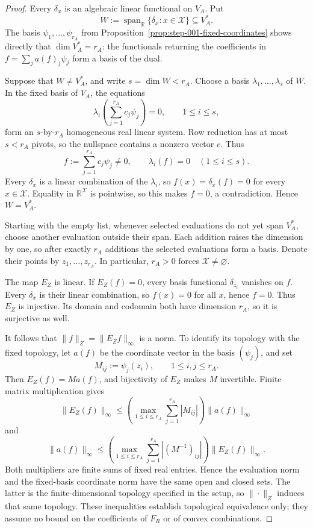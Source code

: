 \begin{proof}
Every \(\delta_x\) is an algebraic linear functional on \(V_A\).  Put
\[
W:=\operatorname{span}_{\mathbb R}\{\delta_x:x\in\mathcal X\}
\subseteq V_A^*.
\]
The basis \(\psi_1,\ldots,\psi_{r_A}\) from
Proposition~\ref{prop:step-001-fixed-coordinates} shows directly that
\(\dim V_A^*=r_A\): the functionals returning the coefficients in
\(f=\sum_ja(f)_j\psi_j\) form a basis of the dual.

Suppose that \(W\ne V_A^*\), and write \(s=\dim W<r_A\).  Choose a basis
\(\lambda_1,\ldots,\lambda_s\) of \(W\).  In the fixed basis of \(V_A\),
the equations
\[
\lambda_i\!\left(\sum_{j=1}^{r_A}c_j\psi_j\right)=0,
\qquad 1\le i\le s,
\]
form an \(s\)-by-\(r_A\) homogeneous real linear system.  Row reduction has
at most \(s<r_A\) pivots, so the nullspace contains a nonzero vector \(c\).
Thus
\[
f:=\sum_{j=1}^{r_A}c_j\psi_j\ne0,
\qquad \lambda_i(f)=0\quad(1\le i\le s).
\]
Every \(\delta_x\) is a linear combination of the \(\lambda_i\), so
\(f(x)=\delta_x(f)=0\) for every \(x\in\mathcal X\).  Equality in
\(\mathbb R^{\mathcal X}\) is pointwise, so this makes \(f=0\), a
contradiction.  Hence \(W=V_A^*\).

Starting with the empty list, whenever selected evaluations do not yet span
\(V_A^*\), choose another evaluation outside their span.  Each addition
raises the dimension by one, so after exactly \(r_A\) additions the selected
evaluations form a basis.  Denote their points by
\(z_1,\ldots,z_{r_A}\).  In particular, \(r_A>0\) forces
\(\mathcal X\ne\varnothing\).

The map \(E_Z\) is linear.  If \(E_Z(f)=0\), every basis functional
\(\delta_{z_i}\) vanishes on \(f\).  Every \(\delta_x\) is their linear
combination, so \(f(x)=0\) for all \(x\), hence \(f=0\).  Thus \(E_Z\) is
injective.  Its domain and codomain both have dimension \(r_A\), so it is
surjective as well.

It follows that \(\|f\|_Z=\|E_Zf\|_\infty\) is a norm.  To identify its
topology with the fixed topology, let \(a(f)\) be the coordinate vector in
the basis \((\psi_j)\), and set
\[
M_{ij}:=\psi_j(z_i),\qquad 1\le i,j\le r_A.
\]
Then \(E_Z(f)=Ma(f)\), and bijectivity of \(E_Z\) makes \(M\) invertible.
Finite matrix multiplication gives
\[
\|E_Z(f)\|_\infty
\le
\left(\max_{1\le i\le r_A}\sum_{j=1}^{r_A}|M_{ij}|\right)
\|a(f)\|_\infty
\]
and
\[
\|a(f)\|_\infty
\le
\left(\max_{1\le i\le r_A}\sum_{j=1}^{r_A}|(M^{-1})_{ij}|\right)
\|E_Z(f)\|_\infty.
\]
Both multipliers are finite sums of fixed real entries.  Hence the evaluation
norm and the fixed-basis coordinate norm have the same open and closed sets.
The latter is the finite-dimensional topology specified in the setup, so
\(\|\cdot\|_Z\) induces that same topology.  These inequalities establish
topological equivalence only; they assume no bound on the coefficients of
\(F_R\) or of convex combinations.
\end{proof}

